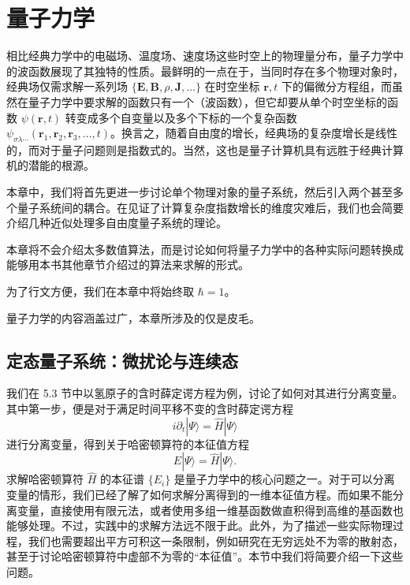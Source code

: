 \chapter{量子力学}

相比经典力学中的电磁场、温度场、速度场这些时空上的物理量分布，量子力学中的波函数展现了其独特的性质。最鲜明的一点在于，当同时存在多个物理对象时，经典场仅需求解一系列场 $\{\bm E,\bm B,\rho,\bm J,\ldots\}$ 在时空坐标 $\bm r,t$ 下的偏微分方程组，而虽然在量子力学中要求解的函数只有一个（波函数），但它却要从单个时空坐标的函数 $\psi(\bm r,t)$ 转变成多个自变量以及多个下标的一个复杂函数 $\psi_{\sigma\lambda\cdots}(\bm r_1,\bm r_2,\bm r_3,\ldots,t)$。换言之，随着自由度的增长，经典场的复杂度增长是线性的，而对于量子问题则是指数式的。当然，这也是量子计算机具有远胜于经典计算机的潜能的根源。

本章中，我们将首先更进一步讨论单个物理对象的量子系统，然后引入两个甚至多个量子系统间的耦合。在见证了计算复杂度指数增长的维度灾难后，我们也会简要介绍几种近似处理多自由度量子系统的理论。

本章将不会介绍太多数值算法，而是讨论如何将量子力学中的各种实际问题转换成能够用本书其他章节介绍过的算法来求解的形式。

为了行文方便，我们在本章中将始终取 $\hbar=1$。

量子力学的内容涵盖过广，本章所涉及的仅是皮毛。

\section{定态量子系统：微扰论与连续态}

我们在 5.3 节中以氢原子的含时薛定谔方程为例，讨论了如何对其进行分离变量。其中第一步，便是对于满足时间平移不变的含时薛定谔方程
\begin{equation}
 i\partial_t|\Psi\rangle=\hat H|\Psi\rangle
\tag{6.1.1}
\end{equation}
进行分离变量，得到关于哈密顿算符的本征值方程
\begin{equation}
 E|\Psi\rangle=\hat H|\Psi\rangle.
\tag{6.1.2}
\end{equation}
求解哈密顿算符 $\hat H$ 的本征谱 $\{E_i\}$ 是量子力学中的核心问题之一。对于可以分离变量的情形，我们已经了解了如何求解分离得到的一维本征值方程。而如果不能分离变量，直接使用有限元法，或者使用多组一维基函数做直积得到高维的基函数也能够处理。不过，实践中的求解方法远不限于此。此外，为了描述一些实际物理过程，我们也需要超出平方可积这一条限制，例如研究在无穷远处不为零的散射态，甚至于讨论哈密顿算符中虚部不为零的“本征值”。本节中我们将简要介绍一下这些问题。

